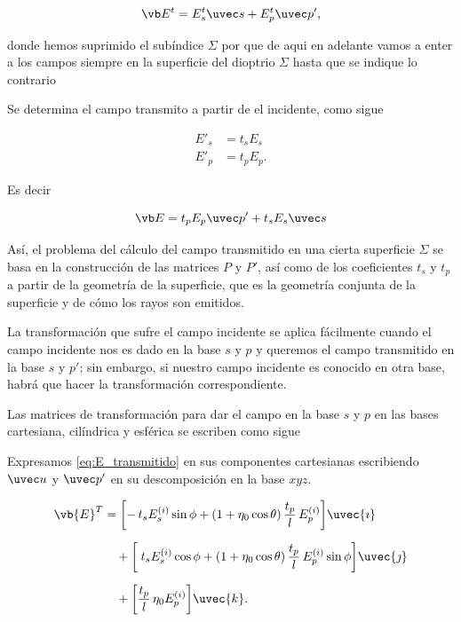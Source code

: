 \begin{equation}
    \vb E^t = E^t_s \uvec s + E^t_p \uvec p',
    \label{eq:E_transmitido}
\end{equation}

donde hemos suprimido el subíndice $\Sigma$ por que de aqui en adelante vamos a enter a los campos siempre en la superficie del dioptrio $\Sigma$ hasta que se indique lo contrario

Se determina el campo transmito a partir de el incidente, como sigue

\begin{align}
    E'_s &= t_s E_s \\
    E'_p &= t_p E_p.
\end{align}

Es decir 


\begin{equation}
    \vb E = t_p E_p \uvec p' + t_s E_s \uvec s 
    \label{eq:transmited_field_on_sigma_from_incident_field_on_sigma_in_ps_basis}
\end{equation}


Así, el problema del cálculo del campo transmitido en una cierta superficie $\Sigma$ se basa en la construcción de las matrices $P$ y $P'$, así como de los coeficientes $t_s$ y $t_p$ a partir de la geometría de la superficie, que es la geometría conjunta de la superficie y de cómo los rayos son emitidos.


La transformación que sufre el campo incidente se aplica fácilmente cuando el
campo incidente nos es dado en la base $s$ y $p$ y queremos el campo transmitido en la base $s$ y $p'$; sin embargo, si nuestro campo incidente es conocido en otra base, habrá que hacer la transformación correspondiente.

Las matrices de transformación para dar el campo en la base $s$ y $p$ en las bases cartesiana, cilíndrica y esférica se escriben como sigue

Expresamos \ref{eq:E_transmitido} en sus componentes cartesianas escribiendo $\uvec u$ y $\uvec p'$ en su descomposición en la base $xyz$. 


\begin{align} \vb{E}^T &= \biggl[ -\,t_s E^{(i)}_s \sin\phi + (1+\eta_0\cos\theta)\,\frac{t_p}{l}\,E^{(i)}_p \biggr] \uvec{\imath} \\[6pt] &\quad + \biggl[ \;t_s E^{(i)}_s \cos\phi + (1+\eta_0\cos\theta)\,\frac{t_p}{l}\,E^{(i)}_p \sin\phi \biggr] \uvec{\jmath} \\[6pt] &\quad + \biggl[ \frac{t_p}{l}\,\eta_0 E^{(i)}_p \biggr] \uvec{k}. \end{align}


